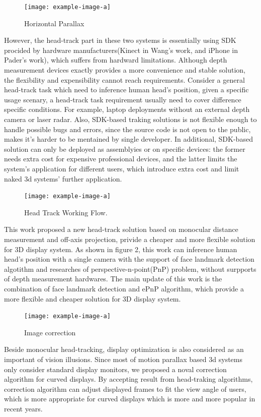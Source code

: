 \begin{figure}[htb]
    \centering
    \texttt{[image: example-image-a]}
    \caption{Horizontal Parallax}\label{F:test-a}
\end{figure}

However, the head-track part in these two systems is essentially using SDK procided by hardware manufacturers(Kinect in Wang's work, and iPhone in Pader's work), which suffers from hardward limitations. Although depth measurement devices exactly provides a more convenience and stable solution, the flexibility and expensibility cannot reach requirements. Consider a general head-track task which need to inference human head's position, given a specific usage scenary, a head-track task requirement usually need to cover difference specific conditions. For example, laptop deployments without an external depth camera or laser radar. Also, SDK-based traking solutions is not flexible enough to handle possible bugs and errors, since the source code is not open to the public, makes it's harder to be mentained by single developer. In additional, SDK-based solution can only be deployed as assemblyies or on specific devices: the former needs extra cost for expensive professional devices, and the latter limits the system's application for different users, which introduce extra cost and limit naked 3d systems' further application.

\begin{figure}[htb]
    \centering
    \texttt{[image: example-image-a]}
    \caption{Head Track Working Flow. }\label{F:test-a}
\end{figure}

This work proposed a new head-track solution based on monocular distance measurement and off-axis projection, privide a cheaper and more flexible solution for 3D display system. As shown in figure 2, this work can inference human head's position with a single camera with the support of face landmark detection algotithm and researches of perspective-n-point(PnP) problem, without surpports of depth measurement hardwares. The main update of this work is the combination of face landmark detection and ePnP algorithm\cite{EPnP_2009}, which provide a more flexible and cheaper solution for 3D display system. 

\begin{figure}[htb]
    \centering
    \texttt{[image: example-image-a]}
    \caption{Image correction}\label{F:test-a}
\end{figure}

Beside monocular head-tracking, display optimization is also considered as an important of vision illusions. Since most of motion parallax based 3d systems only consider standard display monitors, we proposed a noval correction algorithm for curved displays. By accepting result from head-traking algorithms, correction algorithm can adjust displayed frames to fit the view angle of users, which is more appropriate for curved displays which is more and more popular in recent years.

